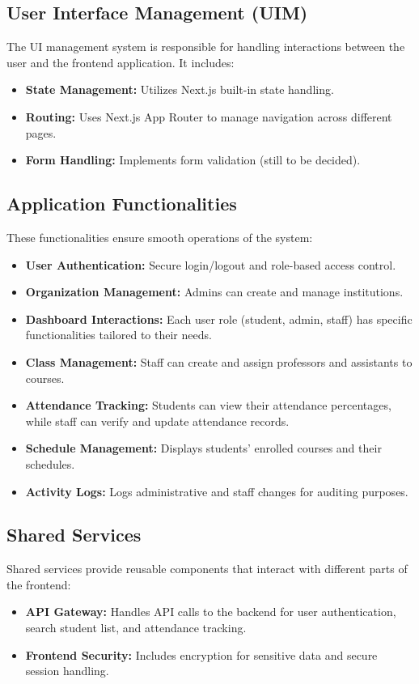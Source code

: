 \documentclass{article}
\begin{document}
\subsection{User Interface Management (UIM)}
The UI management system is responsible for handling interactions between the user and the frontend application. It includes:
\begin{itemize}
    \item \textbf{State Management:} Utilizes Next.js built-in state handling.
    \item \textbf{Routing:} Uses Next.js App Router to manage navigation across different pages.
    \item \textbf{Form Handling:} Implements form validation (still to be decided).
\end{itemize}

\subsection{Application Functionalities}
These functionalities ensure smooth operations of the system:
\begin{itemize}
    \item \textbf{User Authentication:} Secure login/logout and role-based access control.
    \item \textbf{Organization Management:} Admins can create and manage institutions.
    \item \textbf{Dashboard Interactions:} Each user role (student, admin, staff) has specific functionalities tailored to their needs.
    \item \textbf{Class Management:} Staff can create and assign professors and assistants to courses.
    \item \textbf{Attendance Tracking:} Students can view their attendance percentages, while staff can verify and update attendance records.
    \item \textbf{Schedule Management:} Displays students’ enrolled courses and their schedules.
    \item \textbf{Activity Logs:} Logs administrative and staff changes for auditing purposes.
\end{itemize}

\subsection{Shared Services}
Shared services provide reusable components that interact with different parts of the frontend:
\begin{itemize}
    \item \textbf{API Gateway:} Handles API calls to the backend for user authentication, search student list, and attendance tracking.
    \item \textbf{Frontend Security:} Includes encryption for sensitive data and secure session handling.
\end{itemize}
\end{document}
